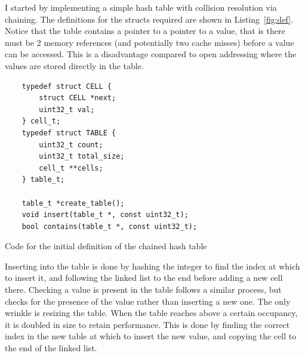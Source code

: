\documentclass[12pt]{article}
\begin{document}
I started by implementing a simple hash table with collision resolution via chaining. 
The definitions for the structs required are shown in Listing~\ref{fig:def}. Notice that
the table contains a pointer to a pointer to a value, that is there must be 2 memory 
references (and potentially two cache misses) before a value can be accessed. This is a
disadvantage compared to open addressing where the values are stored directly in the table.
\begin{listing}
    \centering
    \begin{minipage}[t]{.5\textwidth}
    \begin{verbatim}
    typedef struct CELL {
        struct CELL *next;
        uint32_t val;
    } cell_t;
    typedef struct TABLE {
        uint32_t count;
        uint32_t total_size;
        cell_t **cells;
    } table_t;
    
    table_t *create_table();
    void insert(table_t *, const uint32_t);
    bool contains(table_t *, const uint32_t);
\end{verbatim}
\end{minipage}
\caption{Code for the initial definition of the chained hash table}
\label{fig:def}
\end{listing}

Inserting into the table is done by hashing the integer to find the index at which to insert it, and following the linked
list to the end before adding a new cell there. Checking a value is present in the table follows a similar process, but
checks for the presence of the value rather than inserting a new one. The only wrinkle is resizing the table. When the 
table reaches above a certain occupancy, it is doubled in size to retain performance. This is done by finding the 
correct index in the new table at which to insert the new value, and copying the cell to the end of the linked list.
\end{document}
